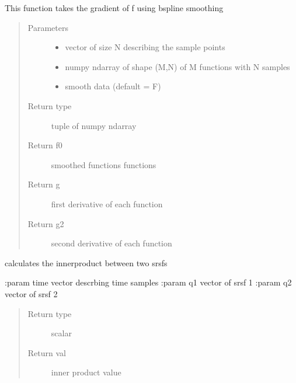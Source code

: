 \documentclass[letterpaper,10pt,english]{sphinxmanual}
\begin{document}
\begin{fulllineitems}
\label{\detokenize{utility_functions:utility_functions.gradient_spline}}
This function takes the gradient of f using b\sphinxhyphen{}spline smoothing
\begin{quote}\begin{description}
\item[{Parameters}] \leavevmode\begin{itemize}
\item {} 
 \textendash{} vector of size N describing the sample points

\item {} 
 \textendash{} numpy ndarray of shape (M,N) of M functions with N samples

\item {} 
 \textendash{} smooth data (default = F)

\end{itemize}

\item[{Return type}] \leavevmode
tuple of numpy ndarray

\item[{Return f0}] \leavevmode
smoothed functions functions

\item[{Return g}] \leavevmode
first derivative of each function

\item[{Return g2}] \leavevmode
second derivative of each function

\end{description}\end{quote}

\end{fulllineitems}


\begin{fulllineitems}
\label{\detokenize{utility_functions:utility_functions.innerprod_q}}
calculates the innerproduct between two srsfs

:param time vector descrbing time samples
:param q1 vector of srsf 1
:param q2 vector of srsf 2
\begin{quote}\begin{description}
\item[{Return type}] \leavevmode
scalar

\item[{Return val}] \leavevmode
inner product value

\end{description}\end{quote}

\end{fulllineitems}
\end{document}
